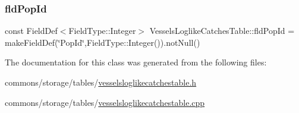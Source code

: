 \mbox{\label{class_vessels_loglike_catches_table_aef223ee0d843ef0d3a94bf888862643b}} 
\subsubsection{\texorpdfstring{fldPopId}{fldPopId}}
{\footnotesize\ttfamily const Field\+Def$<$Field\+Type\+::\+Integer$>$ Vessels\+Loglike\+Catches\+Table\+::fld\+Pop\+Id = make\+Field\+Def(\char`\"{}Pop\+Id\char`\"{},Field\+Type\+::\+Integer()).not\+Null()}



The documentation for this class was generated from the following files\+:\begin{DoxyCompactItemize}
\item 
commons/storage/tables/\mbox{\hyperlink{vesselsloglikecatchestable_8h}{vesselsloglikecatchestable.\+h}}\item 
commons/storage/tables/\mbox{\hyperlink{vesselsloglikecatchestable_8cpp}{vesselsloglikecatchestable.\+cpp}}\end{DoxyCompactItemize}
